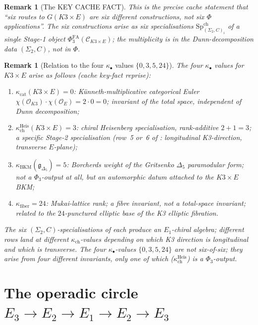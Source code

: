 \documentclass[11pt]{article}
\newtheorem{remark}[theorem]{Remark}
\newcommand{\Eone}{E_{1}}
\newcommand{\PhiFA}{\Phi^{\mathrm{FA}}}
\newcommand{\SpCh}{\mathrm{Sp}^{\mathrm{ch}}}
\newcommand{\cC}{\mathcal{C}}
\newcommand{\cO}{\mathcal{O}}
\newcommand{\frakg}{\mathfrak{g}}
\begin{document}
\begin{remark}[The KEY CACHE FACT]
This is the precise cache statement that ``six routes to $G(K3 \times E)$
are six different constructions, not six $\Phi$ applications''. The
six constructions arise as six specialisations
$\SpCh_{(\Sigma_{2}, C)_{i}}$ of a single Stage-1 object
$\PhiFA_{3}(\cC_{K3 \times E})$; the multiplicity is in the
Dunn-decomposition data $(\Sigma_{2}, C)$, not in $\Phi$.
\end{remark}

\begin{remark}[Relation to the four $\kappa_{\bullet}$ values
$\{0, 3, 5, 24\}$]
The four $\kappa_{\bullet}$ values for $K3 \times E$ arise as follows
(cache key-fact reprise):
\begin{enumerate}[label=(\roman*), leftmargin=*]
  \item $\kappa_{\mathrm{cat}}(K3 \times E) = 0$: K\"unneth-multiplicative
    categorical Euler $\chi(\cO_{K3}) \cdot \chi(\cO_{E}) = 2 \cdot 0 = 0$;
    invariant of the total space, independent of Dunn decomposition;
  \item $\kappa_{\mathrm{ch}}^{\mathrm{Heis}}(K3 \times E) = 3$: chiral
    Heisenberg specialisation, rank-additive $2 + 1 = 3$; a specific
    Stage-2 specialisation (row~5 or~6 of
    : longitudinal K3-direction,
    transverse $E$-plane);
  \item $\kappa_{\mathrm{BKM}}(\frakg_{\Delta_{5}}) = 5$: Borcherds
    weight of the Gritsenko $\Delta_{5}$ paramodular form; not a
    $\Phi_{3}$-output at all, but an automorphic datum attached to
    the $K3 \times E$ BKM;
  \item $\kappa_{\mathrm{fiber}} = 24$: Mukai-lattice rank; a fibre
    invariant, not a total-space invariant; related to the
    $24$-punctured elliptic base of the K3 elliptic fibration.
\end{enumerate}
The six $(\Sigma_{2}, C)$-specialisations of 
each produce an $\Eone$-chiral algebra; different rows land at different
$\kappa_{\mathrm{ch}}$-values depending on which K3 direction is
longitudinal and which is transverse. The four $\kappa_{\bullet}$-values
$\{0, 3, 5, 24\}$ are not six-of-six; they arise from four different
invariants, only one of which ($\kappa_{\mathrm{ch}}^{\mathrm{Heis}}$) is
a $\Phi_{3}$-output.
\end{remark}

\section{The operadic circle $E_{3} \to E_{2} \to E_{1} \to E_{2} \to E_{3}$}
\label{sec:operadic-circle}
\end{document}
